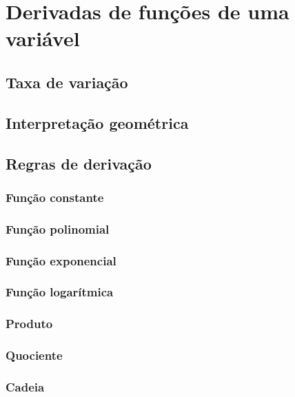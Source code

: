 
\chapter{Derivadas de funções de uma variável}
\section{Taxa de variação}
\section{Interpretação geométrica}
\section{Regras de derivação}
\subsection{Função constante}
\subsection{Função polinomial}
\subsection{Função exponencial}
\subsection{Função logarítmica}
\subsection{Produto}
\subsection{Quociente}
\subsection{Cadeia}